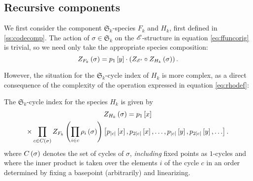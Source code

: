 \documentclass[sectionflow,singlespace,twoside,boldmathhdr]{brandiss} %
\numberwithin{section}{chapter}
\numberwithin{figure}{chapter}
\begin{document}
\subsection{Recursive components}\label{ss:ktcycindrec}
We first consider the component $\mathfrak{S}_{k}$-species $F_{k}$ and $H_{k}$, first defined in \ref{ss:codecomp}.
The action of $\sigma \in \mathfrak{S}_{k}$ on the $\mathscr{E}$-structure in equation \eqref{eq:ffuncorig} is trivial, so we need only take the appropriate species composition:
\begin{equation}
  \label{eq:ffunc}
  Z_{F_{k}} \left( {\sigma} \right) = p_{1} \left[ {y} \right] \cdot \left( {Z_{\mathscr{E}'} \circ Z_{H_{k}} \left( {\sigma} \right)} \right).
\end{equation}

However, the situation for the $\mathfrak{S}_{k}$-cycle index of $H_{k}$ is more complex, as a direct consequence of the complexity of the operation expressed in equation \eqref{eq:rhodef}:
\begin{theorem}
  \label{thm:hfunc}
  The $\mathfrak{S}_{k}$-cycle index for the species $H_{k}$ is given by
  \begin{multline}
    \label{eq:hfunc}
    Z_{H_{k}} \left( {\sigma} \right) = p_{1} \left[ {x} \right] \\
    \times \prod_{c \in C \left( {\sigma} \right)} Z_{F_{k}} \left( {\prod_{i \in c} \rho_{i} \left( {\sigma} \right)} \right) \left[ {p_{\left\vert {c} \right\vert} \left[ {x} \right], p_{2 \left\vert {c} \right\vert} \left[ {x} \right], \dots, p_{\left\vert {c} \right\vert} \left[ {y} \right], p_{2 \left\vert {c} \right\vert} \left[ {y} \right], \dots} \right].
  \end{multline}
  where $C \left( {\sigma} \right)$ denotes the set of cycles of $\sigma$, \emph{including} fixed points as $1$-cycles and where the inner product is taken over the elements $i$ of the cycle $c$ in an order determined by fixing a basepoint (arbitrarily) and linearizing.
\end{theorem}
\end{document}

